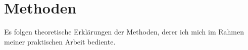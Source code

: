 \chapter{Methoden}

Es folgen theoretische Erklärungen der Methoden, derer ich mich im Rahmen meiner praktischen Arbeit bediente.




